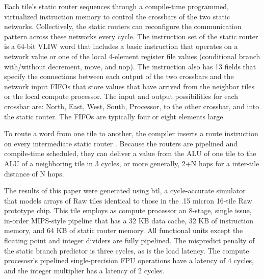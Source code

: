 Each tile's static router sequences through a compile-time programmed,
virtualized instruction memory to control the crossbars of the two
static networks. Collectively, the static routers can reconfigure the
communication pattern across these networks every cycle.  The
instruction set of the static router is a 64-bit VLIW word that
includes a basic instruction that operates on a network value or one
of the local 4-element register file values (conditional branch
with/without decrement, move, and nop). The instruction also has 13
fields that specify the connections between each output of the two
crossbars and the network input FIFOs that store values that have
arrived from the neighbor tiles or the local compute processor.  The
input and output possibilities for each crossbar are: North, East,
West, South, Processor, to the other crossbar, and into the static
router. The FIFOs are typically four or eight elements large.

To route a word from one tile to another, the compiler inserts a route
instruction on every intermediate static router \cite{lee98spacetime}.
Because the routers are pipelined and compile-time scheduled, they can
deliver a value from the ALU of one tile to the ALU of a neighboring
tile in 3 cycles, or more generally, 2+N hops for a inter-tile
distance of N hops.

The results of this paper were generated using btl, a cycle-accurate
simulator that models arrays of Raw tiles identical to those in the
.15 micron 16-tile Raw prototype chip.  This tile employs as compute
processor an 8-stage, single issue, in-order MIPS-style pipeline that
has a 32 KB data cache, 32 KB of instruction memory, and 64 KB of
static router memory. All functional units except the floating point
and integer dividers are fully pipelined. The mispredict penalty of
the static branch predictor is three cycles, as is the load
latency. The compute procesosr's pipelined single-precision FPU
operations have a latency of 4 cycles, and the integer multiplier has
a latency of 2 cycles.




